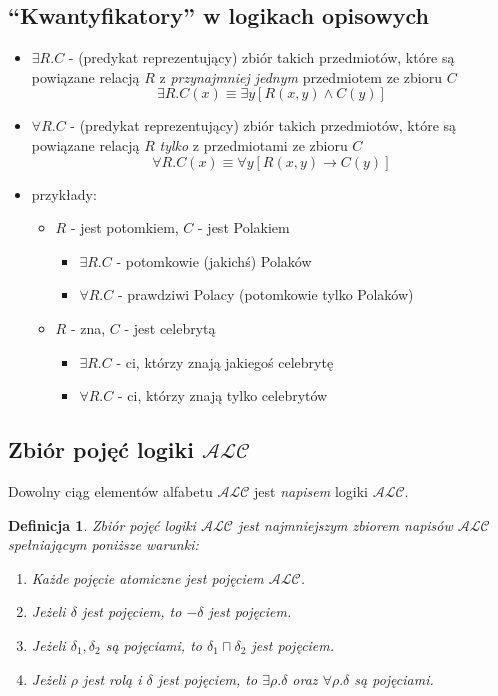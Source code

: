 \documentclass[12pt]{article}
\newtheorem{definicja}{Definicja}
\begin{document}
\subsection{``Kwantyfikatory'' w logikach opisowych}
%
\begin{itemize}
\item $\exists R . C$ - (predykat reprezentujący) zbiór takich przedmiotów, które są powiązane relacją $R$ z \emph{przynajmniej jednym} przedmiotem ze zbioru $C$
$$\exists R . C(x) \equiv \exists y [R(x, y) \land C(y)]$$
%
\item $\forall R . C$ - (predykat reprezentujący) zbiór takich przedmiotów, które są powiązane relacją $R$ \emph{tylko} z przedmiotami ze zbioru $C$
$$\forall R . C(x) \equiv \forall y [R(x, y) \to C(y)]$$
%
\item przykłady:
\begin{itemize}
\item $R$ - jest potomkiem, $C$ - jest Polakiem
\begin{itemize}
\item $\exists R . C$ - potomkowie (jakichś) Polaków
\item  $\forall R . C$ - prawdziwi Polacy (potomkowie tylko Polaków)
\end{itemize}
%
\item $R$ - zna, $C$ - jest celebrytą
\begin{itemize}
\item $\exists R . C$ - ci, którzy znają jakiegoś celebrytę
\item $\forall R . C$ - ci, którzy znają tylko celebrytów
\end{itemize}
\end{itemize}
\end{itemize}
%

\subsection{Zbiór pojęć logiki $\mathcal{ALC}$}
%
Dowolny ciąg elementów alfabetu $\mathcal{ALC}$ jest \emph{napisem} logiki $\mathcal{ALC}$.
%
\begin{definicja}
\label{CONCEPTAL}
Zbiór pojęć logiki $\mathcal{ALC}$ jest najmniejszym zbiorem napisów $\mathcal{ALC}$ spełniającym poniższe warunki:
%
\begin{enumerate}
\item Każde pojęcie atomiczne jest pojęciem $\mathcal{ALC}$.
%
\item Jeżeli $\delta$ jest pojęciem, to $- \delta$ jest pojęciem.
%
\item Jeżeli $\delta_{1}, \delta_{2}$ są pojęciami, to $\delta_{1} \sqcap \delta_{2}$ jest pojęciem.
%
\item Jeżeli $\rho$ jest rolą i $\delta$ jest pojęciem, to $\exists \rho. \delta$ oraz $\forall \rho . \delta$ są pojęciami.
\end{enumerate}
\end{definicja}
%
\end{document}
